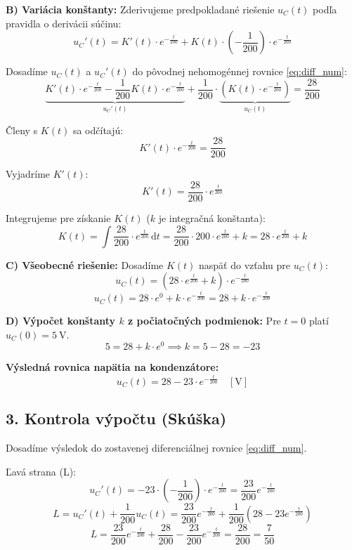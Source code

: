 \documentclass[12pt,a4paper]{article}
\begin{document}
\textbf{B) Variácia konštanty:}
Zderivujeme predpokladané riešenie $u_C(t)$ podľa pravidla o derivácii súčinu:
$$ u_C'(t) = K'(t) \cdot e^{-\frac{t}{200}} + K(t) \cdot \left( -\frac{1}{200} \right) \cdot e^{-\frac{t}{200}} $$

Dosadíme $u_C(t)$ a $u_C'(t)$ do pôvodnej nehomogénnej rovnice \eqref{eq:diff_num}:
$$ \underbrace{K'(t) \cdot e^{-\frac{t}{200}} - \frac{1}{200} K(t) \cdot e^{-\frac{t}{200}}}_{u_C'(t)} + \frac{1}{200} \cdot \underbrace{\left( K(t) \cdot e^{-\frac{t}{200}} \right)}_{u_C(t)} = \frac{28}{200} $$

Členy s $K(t)$ sa odčítajú:
$$ K'(t) \cdot e^{-\frac{t}{200}} = \frac{28}{200} $$

Vyjadríme $K'(t)$:
$$ K'(t) = \frac{28}{200} \cdot e^{\frac{t}{200}} $$

Integrujeme pre získanie $K(t)$ ($k$ je integračná konštanta):
$$ K(t) = \int \frac{28}{200} \cdot e^{\frac{t}{200}} \, \mathrm{d}t = \frac{28}{200} \cdot 200 \cdot e^{\frac{t}{200}} + k = 28 \cdot e^{\frac{t}{200}} + k $$

\textbf{C) Všeobecné riešenie:}
Dosadíme $K(t)$ naspäť do vzťahu pre $u_C(t)$:
$$ u_C(t) = \left( 28 \cdot e^{\frac{t}{200}} + k \right) \cdot e^{-\frac{t}{200}} $$
$$ u_C(t) = 28 \cdot e^{0} + k \cdot e^{-\frac{t}{200}} = 28 + k \cdot e^{-\frac{t}{200}} $$

\textbf{D) Výpočet konštanty $k$ z počiatočných podmienok:}
Pre $t=0$ platí $u_C(0) = \qty{5}{\volt}$.
$$ 5 = 28 + k \cdot e^{0} \implies k = 5 - 28 = -23 $$

\textbf{Výsledná rovnica napätia na kondenzátore:}
\begin{equation}
    u_C(t) = 28 - 23 \cdot e^{-\frac{t}{200}} \quad [\si{\volt}]
\end{equation}

\subsection*{3. Kontrola výpočtu (Skúška)}
Dosadíme výsledok do zostavenej diferenciálnej rovnice \eqref{eq:diff_num}.

Ľavá strana (L):
$$ u_C'(t) = -23 \cdot \left( -\frac{1}{200} \right) \cdot e^{-\frac{t}{200}} = \frac{23}{200} e^{-\frac{t}{200}} $$
$$ L = u_C'(t) + \frac{1}{200} u_C(t) = \frac{23}{200} e^{-\frac{t}{200}} + \frac{1}{200} \left( 28 - 23 e^{-\frac{t}{200}} \right) $$
$$ L = \frac{23}{200} e^{-\frac{t}{200}} + \frac{28}{200} - \frac{23}{200} e^{-\frac{t}{200}} = \frac{28}{200} = \frac{7}{50} $$
\end{document}
